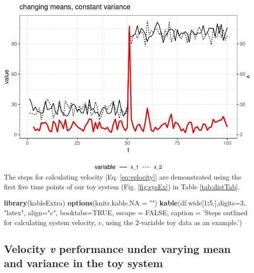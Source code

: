 \documentclass[12pt,twoside,openany]{reedthesis}
\newenvironment{Shaded}{\begin{snugshade}}{\end{snugshade}}
\newcommand{\KeywordTok}[1]{\textcolor[rgb]{0.13,0.29,0.53}{\textbf{#1}}}
\newcommand{\DataTypeTok}[1]{\textcolor[rgb]{0.13,0.29,0.53}{#1}}
\newcommand{\DecValTok}[1]{\textcolor[rgb]{0.00,0.00,0.81}{#1}}
\newcommand{\StringTok}[1]{\textcolor[rgb]{0.31,0.60,0.02}{#1}}
\newcommand{\OtherTok}[1]{\textcolor[rgb]{0.56,0.35,0.01}{#1}}
\newcommand{\OperatorTok}[1]{\textcolor[rgb]{0.81,0.36,0.00}{\textbf{#1}}}
\newcommand{\NormalTok}[1]{#1}
\begin{document}
\includegraphics{_myDissertation_files/figure-latex/velocSysEx1-1.pdf}
The steps for calculating velocity {[}Eq. \eqref{eq:velocity}{]} are
demonstrated using the first five time points of our toy system (Fig.
\ref{fig:sysEx}) in Table \ref{tab:distTab}.
\begin{Shaded}
\begin{Highlighting}[]
\KeywordTok{library}\NormalTok{(kableExtra)}
\KeywordTok{options}\NormalTok{(}\DataTypeTok{knitr.kable.NA =} \StringTok{""}\NormalTok{)}
\KeywordTok{kable}\NormalTok{(df.wide[}\DecValTok{1}\OperatorTok{:}\DecValTok{5}\NormalTok{,],}\DataTypeTok{digits=}\DecValTok{3}\NormalTok{, }\StringTok{"latex"}\NormalTok{, }\DataTypeTok{align=}\StringTok{"c"}\NormalTok{, }\DataTypeTok{booktabs=}\OtherTok{TRUE}\NormalTok{, }\DataTypeTok{escape =} \OtherTok{FALSE}\NormalTok{, }
            \DataTypeTok{caption =} \StringTok{'Steps outlined for calculating system velocity, $v$, using the 2-variable toy data as an example.'}\NormalTok{)}
\end{Highlighting}
\end{Shaded}
\subsection{\texorpdfstring{Velocity \emph{v} performance under varying
mean and variance in the toy
system}{Velocity v performance under varying mean and variance in the toy system}}\label{velocity-v-performance-under-varying-mean-and-variance-in-the-toy-system}
\end{document}

